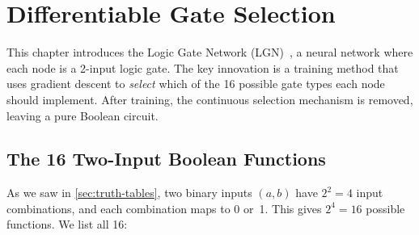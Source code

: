 \chapter{Differentiable Gate Selection}
\label{ch:diff-gates}

This chapter introduces the Logic Gate Network (LGN)~\cite{petersen2022difflogic}, a neural network
where each node is a 2-input logic gate. The key innovation is a
training method that uses gradient descent to \emph{select} which of
the 16 possible gate types each node should implement. After training,
the continuous selection mechanism is removed, leaving a pure Boolean
circuit.


\section{The 16 Two-Input Boolean Functions}
\label{sec:sixteen-gates}

As we saw in \cref{sec:truth-tables}, two binary inputs $(a, b)$
have $2^2 = 4$ input combinations, and each combination maps to 0
or~1. This gives $2^4 = 16$ possible functions. We list all 16:

